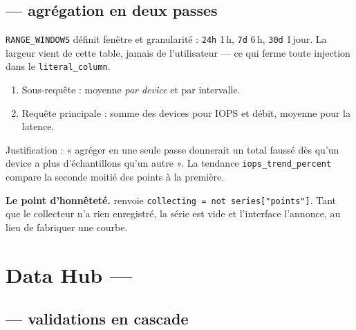\subsection*{ --- agrégation en deux passes}
\texttt{RANGE\_WINDOWS} définit fenêtre et granularité :
\texttt{24h}\,\arrowto{}\,1\,h, \texttt{7d}\,\arrowto{}\,6\,h,
\texttt{30d}\,\arrowto{}\,1\,jour. La largeur vient de cette table, jamais de
l'utilisateur --- ce qui ferme toute injection dans le \texttt{literal\_column}.

\begin{enumerate}
  \item Sous-requête : moyenne \emph{par device} et par intervalle.
  \item Requête principale : somme des devices pour IOPS et débit, moyenne pour
  la latence.
\end{enumerate}

\noindent
Justification : « agréger en une seule passe donnerait un total faussé dès
qu'un device a plus d'échantillons qu'un autre ».
La tendance \texttt{iops\_trend\_percent} compare la seconde moitié des points à
la première.

\begin{keybox}
\textbf{Le point d'honnêteté.}  renvoie
\texttt{collecting = not series["points"]}. Tant que le collecteur n'a rien
enregistré, la série est vide et l'interface l'annonce, au lieu de fabriquer une
courbe.
\end{keybox}

\section{Data Hub --- }

\subsection*{ --- validations en cascade}

